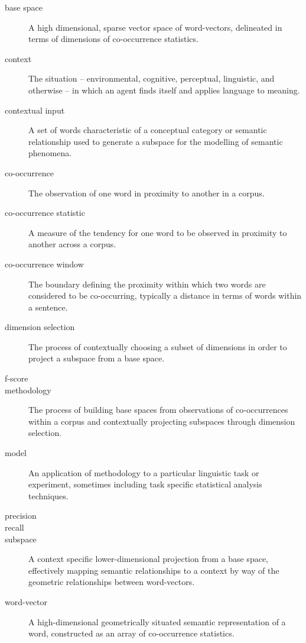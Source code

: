 \begin{glossary}
\begin{description}
\item[base space] A high dimensional, sparse vector space of word-vectors, delineated in terms of dimensions of co-occurrence statistics.
\item[context] The situation -- environmental, cognitive, perceptual, linguistic, and otherwise -- in which an agent finds itself and applies language to meaning.
\item[contextual input] A set of words characteristic of a conceptual category or semantic relationship used to generate a subspace for the modelling of semantic phenomena.
\item[co-occurrence] The observation of one word in proximity to another in a corpus.
\item[co-occurrence statistic] A measure of the tendency for one word to be observed in proximity to another across a corpus.
\item[co-occurrence window] The boundary defining the proximity within which two words are considered to be co-occurring, typically a distance in terms of words within a sentence.  
\item[dimension selection] The process of contextually choosing a subset of dimensions in order to project a subspace from a base space.
\item[f-score] 
\item[methodology] The process of building base spaces from observations of co-occurrences within a corpus and contextually projecting subspaces through dimension selection.
\item[model] An application of methodology to a particular linguistic task or experiment, sometimes including task specific statistical analysis techniques.
\item[precision] 
\item[recall] 
\item [subspace] A context specific lower-dimensional projection from a base space, effectively mapping semantic relationships to a context by way of the geometric relationships between word-vectors.
\item[word-vector] A high-dimensional geometrically situated semantic representation of a word, constructed as an array of co-occurrence statistics.
\end{description}
\end{glossary}
